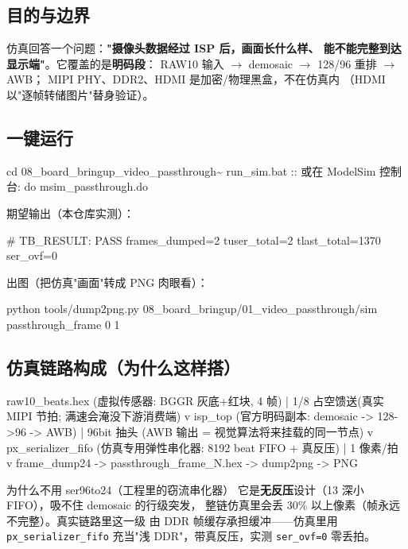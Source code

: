\documentclass[11pt]{ctexart}
\newcommand{\code}[1]{\texttt{#1}}
\begin{document}
\subsection{目的与边界}

仿真回答一个问题：\textbf{"摄像头数据经过 ISP 后，画面长什么样、
能不能完整到达显示端"}。它覆盖的是\textbf{明码段}：
RAW10 输入 $\rightarrow$ demosaic $\rightarrow$ 128/96 重排 $\rightarrow$ AWB；
MIPI PHY、DDR2、HDMI 是加密/物理黑盒，不在仿真内
（HDMI 以"逐帧转储图片"替身验证）。

\subsection{一键运行}

\begin{Verilog}
cd 08_board_bringup_video_passthrough\sim
run_sim.bat                        :: 或在 ModelSim 控制台: do msim_passthrough.do
\end{Verilog}

期望输出（本仓库实测）：

\begin{Verilog}
# TB_RESULT: PASS frames_dumped=2 tuser_total=2 tlast_total=1370 ser_ovf=0
\end{Verilog}

出图（把仿真"画面"转成 PNG 肉眼看）：

\begin{Verilog}
python tools/dump2png.py 08_board_bringup/01_video_passthrough/sim passthrough_frame 0 1
\end{Verilog}

\subsection{仿真链路构成（为什么这样搭）}

\begin{Verilog}
raw10_beats.hex (虚拟传感器: BGGR 灰底+红块, 4 帧)
   |  1/8 占空馈送(真实 MIPI 节拍; 满速会淹没下游消费端)
   v
isp_top (官方明码副本: demosaic -> 128->96 -> AWB)
   |  96bit 抽头 (AWB 输出 = 视觉算法将来挂载的同一节点)
   v
px_serializer_fifo (仿真专用弹性串化器: 8192 beat FIFO + 真反压)
   |  1 像素/拍
   v
frame_dump24 -> passthrough_frame_N.hex -> dump2png -> PNG
\end{Verilog}

\begin{warnbox}{为什么不用 ser96to24（工程里的窃流串化器）}
它是\textbf{无反压}设计（13 深小 FIFO），吸不住 demosaic 的行级突发，
整链仿真里会丢 30\% 以上像素（帧永远不完整）。真实链路里这一级
由 DDR 帧缓存承担缓冲——仿真里用 \code{px\_serializer\_fifo}
充当"浅 DDR"，带真反压，实测 \code{ser\_ovf=0} 零丢拍。
\end{warnbox}
\end{document}
